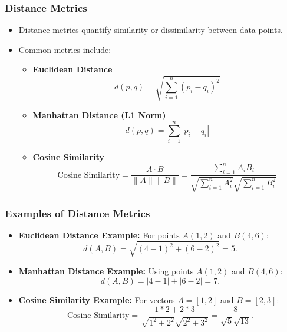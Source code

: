 \documentclass[aspectratio=169]{beamer}
\begin{document}
\begin{frame}[fragile]
    \frametitle{Distance Metrics}
    \begin{itemize}
        \item Distance metrics quantify similarity or dissimilarity between data points.
        \item Common metrics include:
        \begin{itemize}
            \item \textbf{Euclidean Distance}
            \begin{equation}
                d(p, q) = \sqrt{\sum_{i=1}^{n} (p_i - q_i)^2}
            \end{equation}
            \item \textbf{Manhattan Distance (L1 Norm)}
            \begin{equation}
                d(p, q) = \sum_{i=1}^{n} |p_i - q_i|
            \end{equation}
            \item \textbf{Cosine Similarity}
            \begin{equation}
                \text{Cosine Similarity} = \frac{A \cdot B}{\|A\| \|B\|} = \frac{\sum_{i=1}^{n} A_i B_i}{\sqrt{\sum_{i=1}^{n} A_i^2} \sqrt{\sum_{i=1}^{n} B_i^2}}
            \end{equation}
        \end{itemize}
    \end{itemize}
\end{frame}

\begin{frame}[fragile]
    \frametitle{Examples of Distance Metrics}
    \begin{itemize}
        \item \textbf{Euclidean Distance Example:}
        \newline
        For points \( A(1, 2) \) and \( B(4, 6) \):
        \begin{equation}
            d(A, B) = \sqrt{(4-1)^2 + (6-2)^2} = 5.
        \end{equation}
        
        \item \textbf{Manhattan Distance Example:}
        \newline
        Using points \( A(1, 2) \) and \( B(4, 6) \):
        \begin{equation}
            d(A, B) = |4-1| + |6-2| = 7.
        \end{equation}

        \item \textbf{Cosine Similarity Example:}
        \newline
        For vectors \( A = [1, 2] \) and \( B = [2, 3] \):
        \begin{equation}
            \text{Cosine Similarity} = \frac{1*2 + 2*3}{\sqrt{1^2 + 2^2} \sqrt{2^2 + 3^2}} = \frac{8}{\sqrt{5} \sqrt{13}}.
        \end{equation}
    \end{itemize}
\end{frame}
\end{document}
